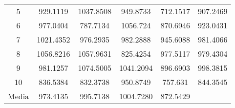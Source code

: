 \documentclass[12pt,a4paper,twoside,openright,titlepage,final]{article}
\begin{document}
\begin{table}[htbp!]
\begin{tabular}{@{}cccccc@{}}
	5                           & 929.1119                                                      & 1037.8508                                                       & 949.8733                                                     & \cellcolor[HTML]{FFFE65}712.1517                       & 907.2469                \\
	6                           & 977.0404                                                      & \cellcolor[HTML]{FFFE65}787.7134                                & 1056.724                                                     & 870.6946                                               & 923.0431                \\
	7                           & 1021.4352                                                     & 976.2935                                                        & 982.2888                                                     & \cellcolor[HTML]{FFFE65}945.6088                       & 981.4066                \\
	8                           & 1056.8216                                                     & 1057.9631                                                       & 825.4254                                                     & \cellcolor[HTML]{FFFE65}977.5117                       & 979.4304                \\
	9                           & 981.1257                                                      & 1074.5005                                                       & 1041.2094                                                    & \cellcolor[HTML]{FFFE65}896.6903                       & 998.3815                \\
	10                          & 836.5384                                                      & 832.3738                                                        & 950.8749                                                     & \cellcolor[HTML]{FFFE65}757.631                        & 844.3545                \\ \midrule
	Media                       & 973.4135                                                      & 995.7138                                                        & 1004.7280                                                    & 872.5429                                               &                         \\ \bottomrule
\end{tabular}
\end{table}
\end{document}

